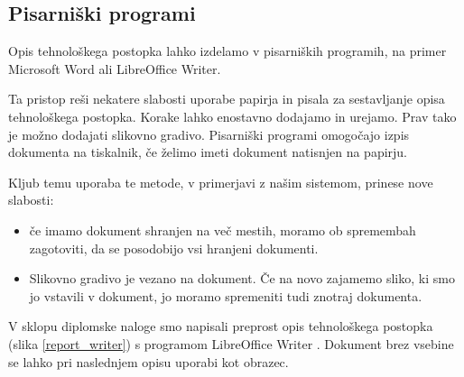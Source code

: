 \documentclass[a4paper, 12pt]{book}
\begin{document}

\subsection{Pisarniški programi}

Opis tehnološkega postopka lahko izdelamo v pisarniških programih, na primer Microsoft Word ali LibreOffice Writer.

Ta pristop reši nekatere slabosti uporabe papirja in pisala za sestavljanje opisa tehnološkega postopka.
Korake lahko enostavno dodajamo in urejamo.
Prav tako je možno dodajati slikovno gradivo.
Pisarniški programi omogočajo izpis dokumenta na tiskalnik, če želimo imeti dokument natisnjen na papirju.

Kljub temu uporaba te metode, v primerjavi z našim sistemom, prinese nove slabosti:
\begin{itemize}
	\item če imamo dokument shranjen na več mestih, moramo ob spremembah zagotoviti, da se posodobijo vsi hranjeni dokumenti.
	\item Slikovno gradivo je vezano na dokument. Če na novo zajamemo sliko, ki smo jo vstavili v dokument, jo moramo spremeniti tudi znotraj dokumenta.
\end{itemize}

V sklopu diplomske naloge smo napisali preprost opis tehnološkega postopka (slika \ref{report_writer}) s programom LibreOffice Writer \cite{writer}.
Dokument brez vsebine se lahko pri naslednjem opisu uporabi kot obrazec.
\clearpage
\end{document}
